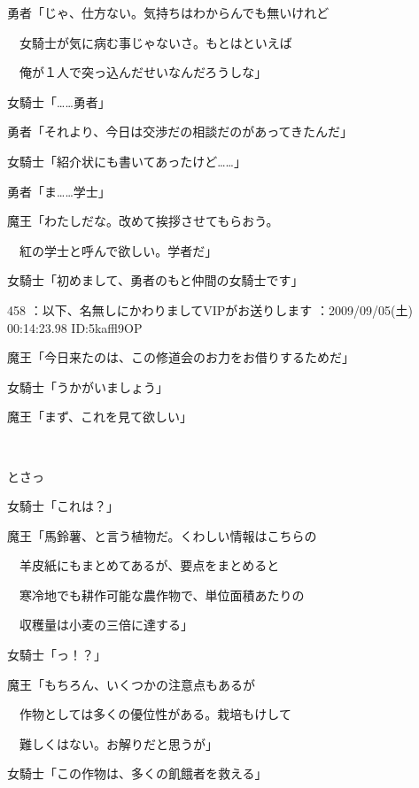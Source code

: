 \documentclass[a4j,twocolumn]{tarticle}
\begin{document}
勇者「じゃ、仕方ない。気持ちはわからんでも無いけれど\par{} 
　女騎士が気に病む事じゃないさ。もとはといえば\par{} 
　俺が１人で突っ込んだせいなんだろうしな」 



女騎士「……勇者」 



勇者「それより、今日は交渉だの相談だのがあってきたんだ」\par{} 
女騎士「紹介状にも書いてあったけど……」 



勇者「ま……学士」\par{} 
魔王「わたしだな。改めて挨拶させてもらおう。\par{} 
　紅の学士と呼んで欲しい。学者だ」 



女騎士「初めまして、勇者のもと仲間の女騎士です」 

	
    
    

458 ：以下、名無しにかわりましてVIPがお送りします ：2009/09/05(土) 00:14:23.98 ID:5kaffl9OP 


魔王「今日来たのは、この修道会のお力をお借りするためだ」\par{} 
女騎士「うかがいましょう」 



魔王「まず、これを見て欲しい」 

　

とさっ 



女騎士「これは？」 



魔王「馬鈴薯、と言う植物だ。くわしい情報はこちらの\par{} 
　羊皮紙にもまとめてあるが、要点をまとめると\par{} 
　寒冷地でも耕作可能な農作物で、単位面積あたりの\par{} 
　収穫量は小麦の三倍に達する」 



女騎士「っ！？」 



魔王「もちろん、いくつかの注意点もあるが \par{}
　作物としては多くの優位性がある。栽培もけして\par{} 
　難しくはない。お解りだと思うが」 



女騎士「この作物は、多くの飢餓者を救える」 
\end{document}

